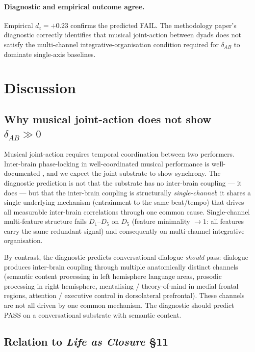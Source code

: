\documentclass[11pt,a4paper]{article}
\begin{document}
\paragraph{Diagnostic and empirical outcome agree.} Empirical $d_z = +0.23$ confirms the predicted FAIL. The methodology paper's diagnostic correctly identifies that musical joint-action between dyads does not satisfy the multi-channel integrative-organisation condition required for $\delta_{AB}$ to dominate single-axis baselines.

\section{Discussion}\label{sec:discussion}

\subsection{Why musical joint-action does not show $\delta_{AB} \gg 0$}\label{sec:discussion-music}

Musical joint-action requires temporal coordination between two performers. Inter-brain phase-locking in well-coordinated musical performance is well-documented \citep{lindenberger2009brains}, and we expect the joint substrate to show synchrony. The diagnostic prediction is not that the substrate has no inter-brain coupling --- it does --- but that the inter-brain coupling is structurally \emph{single-channel}: it shares a single underlying mechanism (entrainment to the same beat/tempo) that drives all measurable inter-brain correlations through one common cause. Single-channel multi-feature structure fails $D_1$--$D_5$ on $D_5$ (feature minimality $\to 1$: all features carry the same redundant signal) and consequently on multi-channel integrative organisation.

By contrast, the diagnostic predicts conversational dialogue \emph{should} pass: dialogue produces inter-brain coupling through multiple anatomically distinct channels (semantic content processing in left hemisphere language areas, prosodic processing in right hemisphere, mentalising / theory-of-mind in medial frontal regions, attention / executive control in dorsolateral prefrontal). These channels are not all driven by one common mechanism. The diagnostic should predict PASS on a conversational substrate with semantic content.

\subsection{Relation to \emph{Life as Closure} \S 11}\label{sec:discussion-life}
\end{document}

